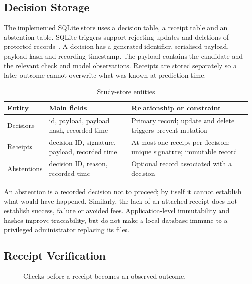 \documentclass[12pt,a4paper,oneside]{report}
\begin{document}
\subsection{Decision Storage}
The implemented SQLite store uses a decision table, a receipt table and an abstention table. SQLite triggers support rejecting updates and deletions of protected records~\cite{sqlite}. A decision has a generated identifier, serialised payload, payload hash and recording timestamp. The payload contains the candidate and the relevant check and model observations. Receipts are stored separately so a later outcome cannot overwrite what was known at prediction time.
\begin{table}[H]\centering\caption{Study-store entities}
\small\begin{tabularx}{\textwidth}{p{25mm}YY}\toprule Entity&Main fields&Relationship or constraint\\\midrule
Decisions&id, payload, payload hash, recorded time&Primary record; update and delete triggers prevent mutation\\
Receipts&decision ID, signature, payload, recorded time&At most one receipt per decision; unique signature; immutable record\\
Abstentions&decision ID, reason, recorded time&Optional record associated with a decision\\\bottomrule\end{tabularx}\end{table}
An abstention is a recorded decision not to proceed; by itself it cannot establish what would have happened. Similarly, the lack of an attached receipt does not establish success, failure or avoided fees. Application-level immutability and hashes improve traceability, but do not make a local database immune to a privileged administrator replacing its files.

\subsection{Receipt Verification}
\begin{figure}[H]\centering
{}\caption{Checks before a receipt becomes an observed outcome.}\end{figure}
\end{document}
